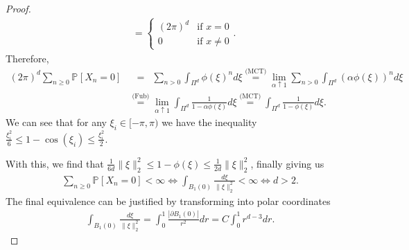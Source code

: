 \begin{proof}
\begin{align}
	&= 
	\begin{cases}
		(2 \pi)^d & \textrm{if }x = 0 \\
		0 & \textrm{if } x \neq 0
	\end{cases}.
\end{align}
Therefore,
\begin{align}
	(2 \pi )^d \sum_{n\geq 0}^{} \mathbb{P}_{} \left[ X_n =0 \right] 
		&\stackrel{\phantom{\textrm{(Fub)}}}{=} \sum_{n> 0}^{} \int_{\Pi^d}^{} \phi(\xi)^n d \xi 
		\stackrel{\textrm{(MCT)}}{=} \lim_{\alpha \uparrow 1} \sum_{n> 0}^{} \int_{\Pi^d}^{} (\alpha \phi(\xi))^n d\xi \\
	& \stackrel{\textrm{(Fub)}}{=} \lim_{\alpha \uparrow 1} \int_{\Pi^d}^{}  \frac{1}{1-\alpha \phi(\xi)} d \xi 
		\stackrel{\textrm{(MCT)}}{=} \int_{\Pi^d}^{} \frac{1}{1-\phi(\xi)} d \xi
.\end{align}
We can see that for any $\xi_i \in [-\pi, \pi )$ we have the inequality $\frac{\xi_i^2}{6} \leq 1 - \cos(\xi_i) \leq \frac{\xi_i^2}{2}$. 
\begin{center}
\end{center}
With this, we find that $\frac{1}{6d}\| \xi \|_2^2 \leq 1 - \phi(\xi) \leq \frac{1}{2d} \| \xi \|_2^2$, finally giving us
\begin{align}
	\sum_{n\geq 0}^{} \mathbb{P}_{} \left[  X_n = 0\right] < \infty \iff \int_{B_1(0)}^{} \frac{d\xi}{\| \xi \|_2^2} < \infty \iff d>2.
\end{align}
The final equivalence can be justified by transforming into polar coordinates
\begin{align}
	\int_{B_1(0)}^{} \frac{d\xi}{\| \xi \|_2^2} = \int_{0}^{1} \frac{| \partial B_1(0) |}{r^2} dr = C \int_{0}^{1} r^{d-3} dr.
\end{align}

\end{proof}

